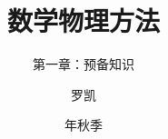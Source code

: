 \documentclass[fontset=fandol,10pt]{ctexbeamer}
\title{数学物理方法}
\subtitle{第一章：预备知识}
\author{罗凯}
\institute{南京理工大学物理学院}
\date{\zhdigits{2026}年秋季}
\begin{document}
\chaptertitleframe
\chapteroutline

\end{document}
